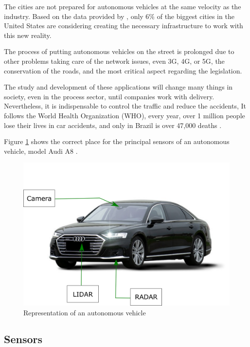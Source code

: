 The cities are not prepared for autonomous vehicles at the same velocity as the industry. Based on the data provided by \cite{cutler2015many}, only 6\% of the biggest cities in the United States are considering creating the necessary infrastructure to work with this new reality.

The process of putting autonomous vehicles on the street is prolonged due to other problems taking care of the network issues, even 3G, 4G, or 5G, the conservation of the roads, and the most critical aspect regarding the legislation. 

The study and development of these applications will change many things in society, even in the process sector, until companies work with delivery. Nevertheless, it is indispensable to control the traffic and reduce the accidents, It follows the World Health Organization (WHO), every year, over 1 million people lose their lives in car accidents, and only in Brazil is over 47,000 deaths \cite{world2004world}. 


Figure \ref{fig:autonomous-vehicles} shows the correct place for the principal sensors of an autonomous vehicle, model Audi A8 \cite{ross2017audi}.


\begin{figure}[H]
\centering
\includegraphics[scale=0.7]{imagens/image823.png}
\caption{Representation of an autonomous vehicle}
\label{fig:autonomous-vehicles}
\end{figure}



\subsection{Sensors}\label{sensors}

